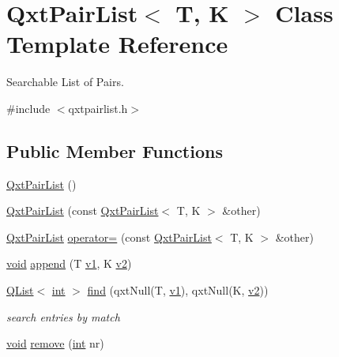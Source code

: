 \hypertarget{class_qxt_pair_list}{\section{Qxt\-Pair\-List$<$ T, K $>$ Class Template Reference}
\label{class_qxt_pair_list}
}


Searchable List of Pairs.  




{\ttfamily \#include $<$qxtpairlist.\-h$>$}

\subsection*{Public Member Functions}
\begin{DoxyCompactItemize}
\item 
\hyperlink{class_qxt_pair_list_a22870fcf84d8d0876e602674eed7fe8a}{Qxt\-Pair\-List} ()
\item 
\hyperlink{class_qxt_pair_list_af41918f30b7fe66d4466cc9aa6df23e4}{Qxt\-Pair\-List} (const \hyperlink{class_qxt_pair_list}{Qxt\-Pair\-List}$<$ T, K $>$ \&other)
\item 
\hyperlink{class_qxt_pair_list}{Qxt\-Pair\-List} \hyperlink{class_qxt_pair_list_adc9801c77969a968fee59945f55bce2d}{operator=} (const \hyperlink{class_qxt_pair_list}{Qxt\-Pair\-List}$<$ T, K $>$ \&other)
\item 
\hyperlink{group___u_a_v_objects_plugin_ga444cf2ff3f0ecbe028adce838d373f5c}{void} \hyperlink{class_qxt_pair_list_a4f7071b42de5412c03858d6b6e8b8ab9}{append} (T \hyperlink{glext_8h_aabdd9aabede45fcf97cea04f88d2ad60}{v1}, K \hyperlink{glext_8h_ae35401c8c2fcdcc48c20ba325ee473ea}{v2})
\item 
\hyperlink{class_q_list}{Q\-List}$<$ \hyperlink{ioapi_8h_a787fa3cf048117ba7123753c1e74fcd6}{int} $>$ \hyperlink{class_qxt_pair_list_ae4e24a6ebe8cbe82da7449ee22fc8bcb}{find} (qxt\-Null(T, \hyperlink{glext_8h_aabdd9aabede45fcf97cea04f88d2ad60}{v1}), qxt\-Null(K, \hyperlink{glext_8h_ae35401c8c2fcdcc48c20ba325ee473ea}{v2}))
\begin{DoxyCompactList}\small\item\em search entries by match \end{DoxyCompactList}\item 
\hyperlink{group___u_a_v_objects_plugin_ga444cf2ff3f0ecbe028adce838d373f5c}{void} \hyperlink{class_qxt_pair_list_a102d0f1eebc1215f89ed5730862ad2ea}{remove} (\hyperlink{ioapi_8h_a787fa3cf048117ba7123753c1e74fcd6}{int} nr)

\end{DoxyCompactItemize}
